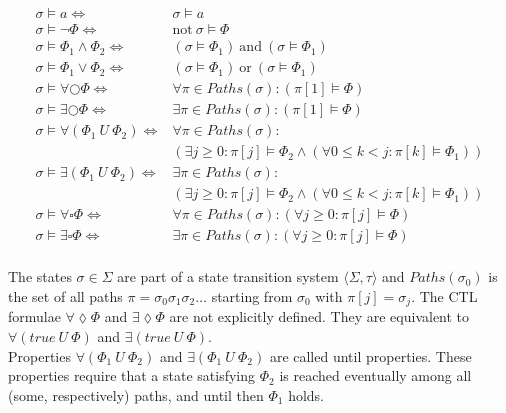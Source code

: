 \documentclass[11pt,a4paper,titlepage]{article}
\theoremstyle{definition}
\begin{document}
\begin{align*}
    \sigma \models a  \iff &\sigma \models a \\ 
    \sigma \models \neg \Phi  \iff &\text{not} \ \sigma \models \Phi \\ 
    \sigma \models \Phi_1 \land \Phi_2   \iff &(\sigma \models \Phi_1) \ \text{and} \ (\sigma \models \Phi_1) \\ 
    \sigma \models \Phi_1 \lor \Phi_2   \iff &(\sigma \models \Phi_1) \ \text{or} \ (\sigma \models \Phi_1) \\ 
    \sigma \models \forall\bigcirc\Phi \iff  &\forall \pi \in Paths(\sigma) \colon (\pi [1] \models \Phi) \\ 
    \sigma \models \exists\bigcirc\Phi \iff  &\exists \pi \in Paths(\sigma) \colon (\pi [1] \models \Phi) \\ 
    \sigma \models \forall(\Phi_1 \ U \ \Phi_2) \iff &\forall \pi \in Paths(\sigma) \colon \\
    &(\exists j \geq 0 \colon \pi[j] \models \Phi_2 \land (\forall 0 \leq k < j \colon \pi[k] \models \Phi_1)) \\ 
    \sigma \models \exists(\Phi_1 \ U \ \Phi_2) \iff &\exists \pi \in Paths(\sigma) \colon\\
    &(\exists j \geq 0 \colon \pi[j] \models \Phi_2 \land (\forall 0 \leq k < j \colon \pi[k] \models \Phi_1)) \\ 
    \sigma \models \forall\square\Phi \iff  &\forall \pi \in Paths(\sigma) \colon (\forall j \geq 0 \colon \pi[j] \models \Phi) \\ 
    \sigma \models \exists\square\Phi \iff  &\exists \pi \in Paths(\sigma) \colon (\forall j \geq 0 \colon \pi[j] \models \Phi) \\ 
\end{align*}

The states $\sigma \in \Sigma$ are part of a state transition system $\langle \Sigma, \tau \rangle$ and 
$Paths(\sigma_0)$ is the set of all paths $\pi = \sigma_0 \sigma_1 \sigma_2 \dots$ starting from $\sigma_0$ with $\pi[j] = \sigma_j$.
The CTL formulae $\forall\lozenge\Phi$ and $\exists\lozenge\Phi$ are not explicitly defined. They are equivalent to 
$\forall(true \ U \ \Phi)$ and $\exists(true \ U \ \Phi)$. \\

Properties $\forall(\Phi_1 \ U \ \Phi_2)$ and $\exists(\Phi_1 \ U \ \Phi_2)$ are called \textsf{until} properties.
These properties require that a state satisfying $\Phi_2$ is reached eventually among all (some, respectively) paths, 
and until then $\Phi_1$ holds.\\
\end{document}
